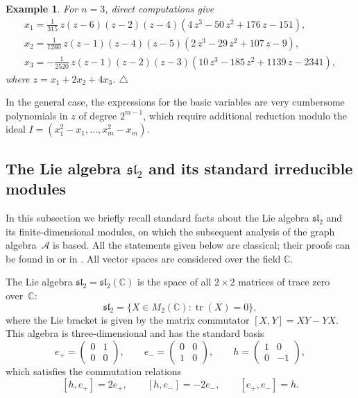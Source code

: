 \documentclass[12pt,reqno]{amsart}
\newtheorem{example}{Example}[section]
\begin{document}
\begin{example}{\rm
For $n=3$, direct computations give
\begin{gather*}
x_1={\frac {1}{315}}\,z \left( z-6 \right)  \left( z-2 \right)  \left( z-4
 \right)  \left( 4\,{z}^{3}-50\,{z}^{2}+176\,z-151 \right) ,\\
x_2= {\frac {1}{1260}}\,z \left( z-1 \right)  \left( z-4 \right)  \left( z-
5 \right)  \left( 2\,{z}^{3}-29\,{z}^{2}+107\,z-9 \right) ,\\
x_3=-{\frac {1}{2520}}\,z \left( z-1 \right)  \left( z-2 \right)  \left( z
-3 \right)  \left( 10\,{z}^{3}-185\,{z}^{2}+1139\,z-2341 \right),
\end{gather*}
where $z=x_1+2 x_2 +4 x_3$.
}
$\triangle$ \end{example}


In the general case, the expressions for the basic variables are very
cumbersome polynomials in $z$ of degree $2^{m-1}$, which require additional
reduction modulo the ideal
$I=(x_1^2-x_1, \ldots, x_m^2-x_m).$


\subsection{The Lie algebra $\mathfrak{sl}_2$
  and its standard irreducible modules}

In this subsection we briefly recall standard facts about the Lie algebra
$\mathfrak{sl}_2$ and its finite-dimensional modules, on which the subsequent
analysis of the graph algebra~$\mathcal{A}$ is based.
All the statements given below are classical; their proofs can be found in
\cite[Chapter~11]{FH} or in \cite[Chapters~7--8]{Humphreys}.
All vector spaces are considered over the field $\mathbb{C}$.

\medskip

The Lie algebra $\mathfrak{sl}_2 = \mathfrak{sl}_2(\mathbb{C})$ is the space
of all $2 \times 2$ matrices of trace zero over~$\mathbb{C}$:
$$
  \mathfrak{sl}_2
  = \bigl\{X \in M_2(\mathbb{C}) : \operatorname{tr}(X) = 0\bigr\},
$$
where the Lie bracket is given by the matrix commutator
$[X, Y] = XY - YX$.
This algebra is three-dimensional and has the standard basis
$$
  e_+ = \begin{pmatrix} 0 & 1 \\ 0 & 0 \end{pmatrix}, \qquad
  e_- = \begin{pmatrix} 0 & 0 \\ 1 & 0 \end{pmatrix}, \qquad
  h   = \begin{pmatrix} 1 & 0 \\ 0 & -1 \end{pmatrix},
$$
which satisfies the commutation relations
\begin{equation}\label{sl2_relations}
  [h, e_+] = 2e_+, \qquad
  [h, e_-] = -2e_-, \qquad
  [e_+, e_-] = h.
\end{equation}
\end{document}
